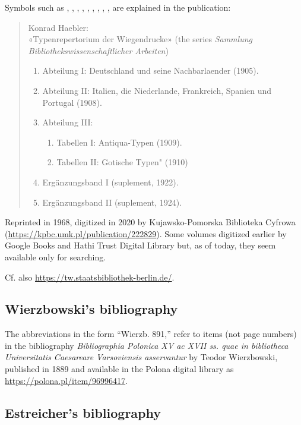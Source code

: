 \documentclass[12pt]{article}
\begin{document}
Symbols such as , , , , ,
, , , ,  are explained in the
publication:

\begin{quote}
  Konrad Haebler:\\ «Typenrepertorium der Wiegendrucke» (the series
  \textit{Sammlung Bibliothekswissenschaftlicher Arbeiten})
  \begin{enumerate}
  \item Abteilung I: Deutschland und seine Nachbarlaender (1905).
  \item Abteilung II: Italien, die Niederlande, Frankreich, Spanien und Portugal (1908).
  \item Abteilung III:
    \begin{enumerate}
    \item Tabellen I: Antiqua-Typen (1909).
    \item Tabellen II: Gotische Typen" (1910)
    \end{enumerate}
  \item Ergänzungsband I (suplement, 1922).
  \item Ergänzungsband II (suplement, 1924).
  \end{enumerate}
\end{quote}
Reprinted in 1968, digitized in 2020 by Kujawsko-Pomorska Biblioteka
Cyfrowa (\url{https://kpbc.umk.pl/publication/222829}). Some volumes
digitized earlier by Google Books and Hathi Trust Digital Library but,
as of today, they seem available only for searching.

\noindent
Cf. also \url{https://tw.staatsbibliothek-berlin.de/}.

\subsection{Wierzbowski's bibliography}
\label{sec:wierzb-bibl}

The abbreviations in the form ``Wierzb. 891,'' refer to items (not
page numbers) in the bibliography \textit{Bibliographia Polonica XV ac
  XVII ss. quae in bibliotheca Universitatis Caesareare Varsoviensis
  asservantur} by Teodor Wierzbowski, published in 1889 and available
in the Polona digital library as
\url{https://polona.pl/item/96996417}.

\subsection{Estreicher's bibliography}
\label{sec:estr-bibl}
\end{document}
